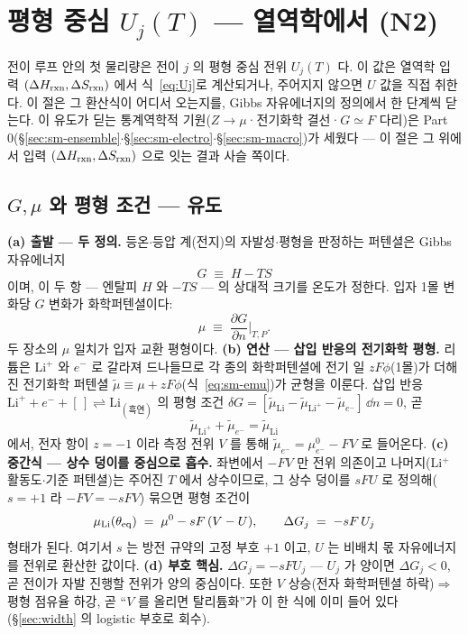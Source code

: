 \section{평형 중심 $U_j(T)$ --- 열역학에서 (N2)}\label{sec:center}
전이 루프 안의 첫 물리량은 전이 $j$ 의 평형 중심 전위 $U_j(T)$ 다. 이 값은 열역학 입력 $(\Delta H_{\mathrm{rxn}},\Delta S_{\mathrm{rxn}})$
에서 식~\eqref{eq:Uj}로 계산되거나, 주어지지 않으면 $U$ 값을 직접 취한다. 이 절은 그 환산식이 어디서 오는지를, Gibbs
자유에너지의 정의에서 한 단계씩 닫는다. 이 유도가 딛는 통계역학적 기원($Z\to\mu$·전기화학 결선·$G\simeq F$ 다리)은
Part 0(\S\ref{sec:sm-ensemble}$\cdot$\S\ref{sec:sm-electro}$\cdot$\S\ref{sec:sm-macro})가 세웠다 --- 이 절은 그 위에서 입력
$(\Delta H_{\mathrm{rxn}},\Delta S_{\mathrm{rxn}})$ 으로 잇는 결과 사슬 쪽이다.

\subsection{$G,\mu$ 와 평형 조건 --- 유도}\label{sec:center-eqcond}
\textbf{(a) 출발 --- 두 정의.} 등온$\cdot$등압 계(전지)의 자발성$\cdot$평형을 판정하는 퍼텐셜은 Gibbs 자유에너지
\begin{equation}
G\;\equiv\;H-TS
\label{eq:gibbsdef}
\end{equation}
이며, 이 두 항 --- 엔탈피 $H$ 와 $-TS$ --- 의 상대적 크기를 온도가 정한다. 입자 1몰 변화당 $G$ 변화가 화학퍼텐셜이다:
\begin{equation}
\mu\;\equiv\;\frac{\partial G}{\partial n}\Big|_{T,P}.
\label{eq:mudef}
\end{equation}
두 장소의 $\mu$ 일치가 입자 교환 평형이다. \textbf{(b) 연산 --- 삽입 반응의 전기화학 평형.} 리튬은 Li$^+$ 와 $e^-$ 로
갈라져 드나들므로 각 종의 화학퍼텐셜에 전기 일 $zF\phi$(1몰)가 더해진 전기화학 퍼텐셜 $\tilde\mu\equiv\mu+zF\phi$(식~\eqref{eq:sm-emu})가 균형을
이룬다. 삽입 반응 $\mathrm{Li}^++e^-+[\,]\rightleftharpoons\mathrm{Li}_{(\text{흑연})}$ 의 평형 조건
$\delta G=[\tilde\mu_\mathrm{Li}-\tilde\mu_{\mathrm{Li}^+}-\tilde\mu_{e^-}]\,\dd n=0$, 곧
\begin{equation}
\tilde\mu_{\mathrm{Li}^+}+\tilde\mu_{e^-}=\tilde\mu_\mathrm{Li}
\label{eq:eqbalance}
\end{equation}
에서, 전자 항이 $z=-1$ 이라 측정 전위 $V$ 를 통해 $\tilde\mu_{e^-}=\mu_{e^-}^0-FV$ 로 들어온다. \textbf{(c) 중간식 ---
상수 덩이를 중심으로 흡수.} 좌변에서 $-FV$ 만 전위 의존이고 나머지(Li$^+$ 활동도$\cdot$기준 퍼텐셜)는 주어진 $T$ 에서
상수이므로, 그 상수 덩이를 $sFU$ 로 정의해($s=+1$ 라 $-FV=-sFV$) 묶으면 평형 조건이
\begin{equation}
\mu_\mathrm{Li}(\theta_{\mathrm{eq}})\;=\;\mu^0-sF\,(V-U),
\qquad \Delta G_j\;=\;-sF\,U_j
\label{eq:eqcond}
\end{equation}
형태가 된다. 여기서 $s$ 는 방전 규약의 고정 부호 $+1$ 이고, $U$ 는 비배치 몫 자유에너지를 전위로 환산한 값이다. \textbf{(d) 부호 핵심.} $\Delta G_j=-sFU_j$ ---
$U_j$ 가 양이면 $\Delta G_j<0$, 곧 전이가 자발 진행할 전위가 양의 중심이다. 또한 $V$ 상승(전자 화학퍼텐셜 하락)$\Rightarrow$
평형 점유율 하강, 곧 ``$V$ 를 올리면 탈리튬화''가 이 한 식에 이미 들어 있다(\S\ref{sec:width} 의 logistic 부호로 회수).

